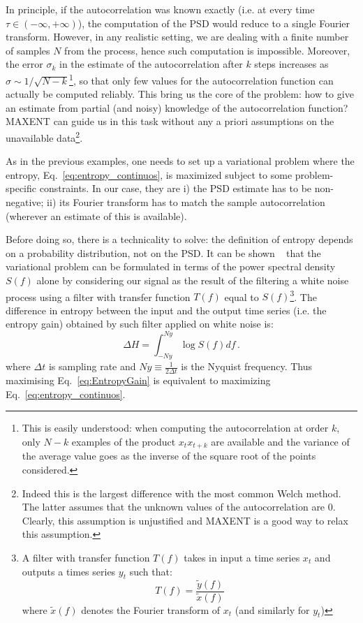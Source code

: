 \documentclass{aa}
\begin{document}
In principle, if the autocorrelation was known exactly (i.e. at every time $\tau \in (-\infty,+\infty)$), the computation of the PSD would reduce to a single Fourier transform. However, in any realistic setting, we are dealing with a finite number of samples $N$ from the process, hence such computation is impossible.
Moreover, the error $\sigma_k$ in the estimate of the autocorrelation after $k$ steps increases as $\sigma \sim 1/\sqrt{N - k}$\footnote{
This is easily understood: when computing the autocorrelation at order $k$, only $N-k$ examples of the product $x_t x_{t+k}$ are available and the variance of the average value goes as the inverse of the square root of the points considered.
}, so that only few values for the autocorrelation function can actually be computed reliably.
This bring us the core of the problem: how to give an estimate from partial (and noisy) knowledge of the autocorrelation function? MAXENT can guide us in this task without any a priori assumptions on the unavailable data\footnote{Indeed this is the largest difference with the most common Welch method. The latter assumes that the unknown values of the autocorrelation are $0$. Clearly, this assumption is unjustified and MAXENT is a good way to relax this assumption.}.

As in the previous examples, one needs to set up a variational problem where the entropy, Eq.~\eqref{eq:entropy_continuos}, is maximized 
subject to some problem-specific constraints. In our case, they are i) the PSD estimate has to be non-negative; ii) its Fourier transform has to match the sample autocorrelation (wherever an estimate of this is available).

Before doing so, there is a technicality to solve: the definition of entropy depends on a probability distribution, not on the PSD.
It can be shown ~\citep[e.g.]{AblesMESA, Bartlett} that the variational problem can be formulated in terms of the power spectral density $S(f)$ alone by considering our signal as the result of the filtering a white noise process using a filter with transfer function $T(f)$ equal to $S(f)$\footnote{
A filter with transfer function $T(f)$ takes in input a time series $x_t$ and outputs a times series $y_t$ such that:
$$T(f) = \frac{\tilde{y}(f)}{\tilde{x}(f)}$$
where $\tilde{x}(f)$ denotes the Fourier transform of $x_t$ (and similarly for $y_t$)
}.
The difference in entropy between the input and the output time series (i.e. the entropy gain) obtained by such filter applied on white noise is:
\begin{equation}\label{eq:EntropyGain}
    \Delta H = \int_{- Ny}^{Ny}\log S(f) df\,.
\end{equation}
where $\Delta t$ is sampling rate and $Ny \equiv \frac{1}{2 \Delta t}$  is the Nyquist frequency.
Thus maximising Eq.~\eqref{eq:EntropyGain} is equivalent to maximizing Eq.~\eqref{eq:entropy_continuos}.
\end{document}
